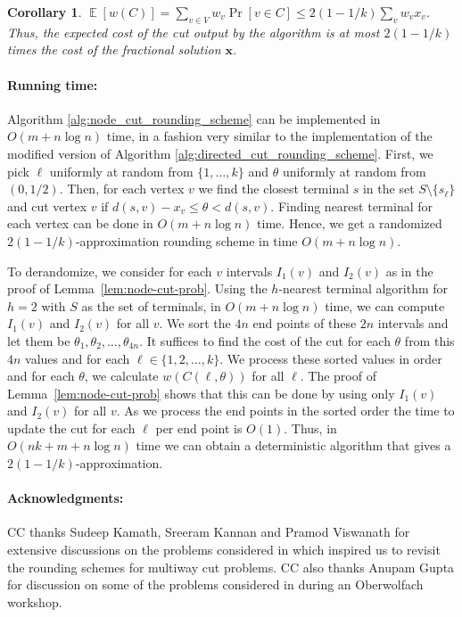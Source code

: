 \documentclass[11pt]{article}
\newtheorem{corollary}[lemma]{Corollary}
\DeclareMathOperator*{\Ex}{\mathbb{E}}
\def\bx{\textbf{x}}
\begin{document}
\begin{corollary}
  $\Ex[w(C)] = \sum_{v \in V} w_v \Pr[v \in C] \le 2(1-1/k) \sum_v w_v x_v$.
  Thus, the expected cost of the cut output by the algorithm is at most
  $2(1-1/k)$ times the cost of the fractional solution $\bx$.
\end{corollary}

\paragraph{Running time:} 
Algorithm \ref{alg:node_cut_rounding_scheme} can be implemented in
$O(m + n \log n)$ time, in a fashion very similar to the
implementation of the modified version of Algorithm
\ref{alg:directed_cut_rounding_scheme}. First, we pick $\ell$
uniformly at random from $\{1,\dots,k\}$ and $\theta$ uniformly at
random from $(0,1/2)$. Then, for each vertex $v$ we find the closest
terminal $s$ in the set $S \setminus \{s_\ell\}$ and cut vertex $v$ if
$d(s,v) - x_v \leq \theta < d(s,v)$. Finding nearest terminal for each
vertex can be done in $O(m + n \log n)$ time. Hence, we get a
randomized $2(1-1/k)$-approximation rounding scheme in time $O(m + n \log n)$.

To derandomize, we consider for each $v$ intervals $I_1(v)$ and
$I_2(v)$ as in the proof of Lemma~\ref{lem:node-cut-prob}. Using the
$h$-nearest terminal algorithm for $h = 2$ with $S$ as the set of
terminals, in $O(m + n \log n)$ time, we can compute $I_1(v)$ and
$I_2(v)$ for all $v$. We sort the $4n$ end points of these $2n$
intervals and let them be $\theta_1,\theta_2,\ldots,\theta_{4n}$.  It
suffices to find the cost of the cut for each $\theta$ from this $4n$
values and for each $\ell \in \{1,2,\ldots,k\}$.  We process these
sorted values in order and for each $\theta$, we calculate
$w(C(\ell,\theta))$ for all $\ell$.  The proof of
Lemma~\ref{lem:node-cut-prob} shows that this can be done by using
only $I_1(v)$ and $I_2(v)$ for all $v$.  As we process the end points
in the sorted order the time to update the cut for each $\ell$ per end
point is $O(1)$.  Thus, in $O(nk + m + n \log n)$ time we can obtain a
deterministic algorithm that gives a $2(1-1/k)$-approximation.

\paragraph{Acknowledgments:} CC thanks Sudeep Kamath, Sreeram Kannan and
Pramod Viswanath for extensive discussions on the problems considered
in \cite{KKCV15} which inspired us to revisit the rounding schemes
for multiway cut problems. CC also thanks Anupam Gupta
for discussion on some of the problems considered in \cite{KKCV15} during
an Oberwolfach workshop. 
\end{document}
